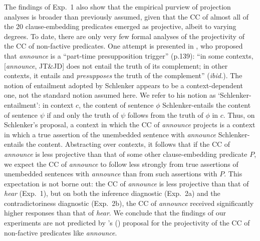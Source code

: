 \documentclass[11pt,fleqn]{article}
\newcommand{\6}{\mbox{$[\hspace*{-.6mm}[$}}
\newcommand{\9}{\mbox{$]\hspace*{-.6mm}]$}}
\newcommand{\citetpos}[1]{\citeauthor{#1}'s (\citeyear{#1})}
\begin{document}
{\begin{itemize}
The findings of Exp.~1 also show that the empirical purview of projection analyses is broader than previously assumed, given that the CC of almost all of the 20 clause-embedding predicates emerged as projective, albeit to varying degrees. To date, there are only very few formal analyses of the projectivity of the CC of non-factive predicates.  One attempt is presented in \citealt{schlenker10}, who proposed that {\em announce} is a ``part-time presupposition trigger'' (p.139): ``in some contexts, [{\em announce}, JT\&JD] does not entail the truth of its complement; in other contexts, it entails and {\em presupposes} the truth of the complement'' ({\em ibid.}). The notion of entailment adopted by Schlenker appears to be a context-dependent one, not the standard notion assumed here. We refer to his notion as `Schlenker-entailment': in context $c$, the content of sentence $\phi$ Schlenker-entails the content of sentence $\psi$ if and only the truth of $\psi$ follows from the truth of $\phi$ in $c$.  Thus, on Schlenker's proposal, a context in which the CC of {\em announce} projects is a context in which a true assertion of the unembedded sentence with {\em announce} Schlenker-entails the content. Abstracting over contexts, it follows that if the CC of {\em announce} is less projective than that of some other clause-embedding predicate $P$, we expect the CC of {\em announce} to follow less strongly from true assertions of unembedded sentences with {\em announce} than from such assertions with $P$. This expectation is not borne out: the CC of {\em announce} is less projective than that of {\em hear} (Exp.~1), but on both the inference diagnostic (Exp.~2a) and the contradictoriness diagnostic (Exp.~2b), the CC of {\em announce} received significantly higher responses than that of {\em hear}. We conclude that the findings of our experiments are not predicted by \citetpos{schlenker10} proposal for the projectivity of the CC of non-factive predicates like {\em announce}.


\end{itemize}}
\end{document}
